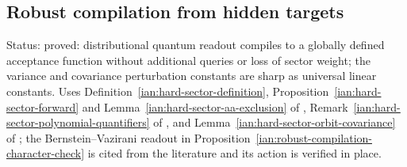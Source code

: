\subsection{Robust compilation from hidden targets}\label{ian:robust-compilation}

Status: proved: distributional quantum readout compiles to a globally defined acceptance function without additional queries or loss of sector weight; the variance and covariance perturbation constants are sharp as universal linear constants. Uses Definition~\ref{ian:hard-sector-definition}, Proposition~\ref{ian:hard-sector-forward} and Lemma~\ref{ian:hard-sector-aa-exclusion} of , Remark~\ref{ian:hard-sector-polynomial-quantifiers} of , and Lemma~\ref{ian:hard-sector-orbit-covariance} of ; the Bernstein--Vazirani readout in Proposition~\ref{ian:robust-compilation-character-check} is cited from the literature and its action is verified in place.

